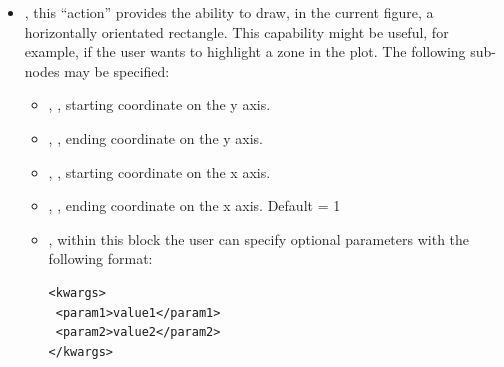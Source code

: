 \begin{itemize}
\begin{itemize}
\begin{lstlisting}[style=XML]
<kwargs>
 <param1>value1</param1>
 <param2>value2</param2>
</kwargs>
\end{lstlisting}

  The kwargs block is able to convert whatever string into a python type (for
  example \texttt{\{`1stKey':45\}} will
  be converted into a dictionary,
  \texttt{[56,67]} into a list, etc.).
    For reference regarding the available kwargs, see
    ``matplotlib.pyplot.axvline'' method in~\cite{MatPlotLib}.
  \end{itemize}
  \nb This capability is not available for 3-D plots.
  \item {}, this ``action'' provides the ability to
  draw, in the current figure, a horizontally orientated rectangle.
  This capability might be useful, for example, if the user wants to highlight a
  zone in the plot.
  The following sub-nodes may be specified:
  \begin{itemize}
    \item {}, , starting coordinate on
    the y axis.
    \item {}, , ending coordinate on the
    y axis.
    \item {}, , starting coordinate on
    the x axis.
    \item {}, , ending coordinate on the
    x axis.
    Default = 1
    \item {}, within this block the user can specify optional
    parameters with the following format:

\begin{lstlisting}[style=XML]
<kwargs>
 <param1>value1</param1>
 <param2>value2</param2>
</kwargs>
\end{lstlisting}


\end{itemize}
\end{itemize}
